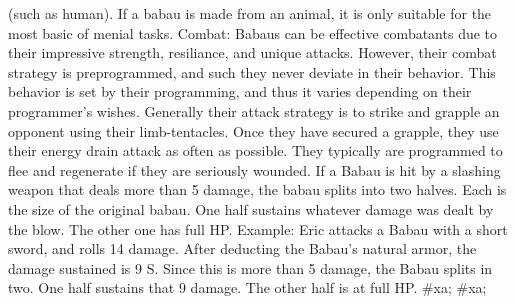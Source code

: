 \documentclass[twoside]{book}
\begin{document}
\begin{multicols}{2}
{           (such as human). If a babau is made from an animal, it is only
           suitable for the most basic of menial tasks. Combat: Babaus
           can be effective combatants due to their impressive strength,
           resiliance, and unique attacks. However, their combat strategy
           is preprogrammed, and such they never deviate in their
           behavior. This behavior is set by their programming, and thus
           it varies depending on their programmer's wishes.
           Generally their attack strategy is to strike and grapple an
           opponent using their limb-tentacles. Once they have secured a
           grapple, they use their energy drain attack as often as
           possible. They typically are programmed to flee and regenerate
           if they are seriously wounded. If a Babau is hit by a slashing
           weapon that deals more than 5 damage, the babau splits into
           two halves. Each is the size of the original babau. One half
           sustains whatever damage was dealt by the blow. The other one
           has full HP. Example: Eric attacks a Babau with a short sword,
           and rolls 14 damage. After deducting the Babau's natural
           armor, the damage sustained is 9 S. Since this is more than 5
           damage, the Babau splits in two. One half sustains that 9
           damage. The other half is at full HP. }\vspace{1ex}
    \hspace{-2ex}
\#xa;
\#xa;
\vspace{1ex}
    \hspace{-2ex}

\end{multicols}
\end{document}
